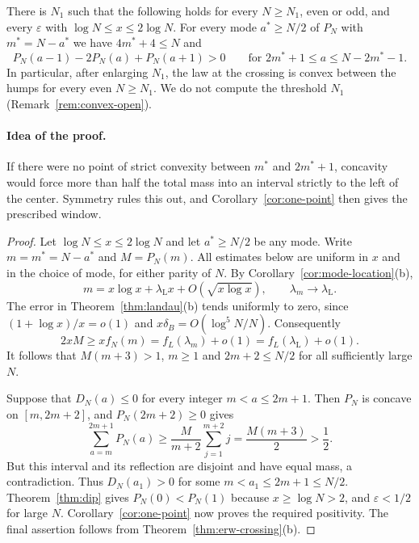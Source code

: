 \begin{proposition}\label{thm:convex-large}
There is $N_1$ such that the following holds for every $N\ge N_1$, even or odd, and every
$\varepsilon$ with $\log N\le x\le2\log N$. For every mode $a^*\ge N/2$ of $P_N$ with
$m^*=N-a^*$ we have $4m^*+4\le N$ and
\[
 P_N(a-1)-2P_N(a)+P_N(a+1)>0\qquad\text{for }2m^*+1\le a\le N-2m^*-1 .
\]
In particular, after enlarging $N_1$, the law at the crossing is convex between the humps for
every even $N\ge N_1$. We do not compute the threshold $N_1$ (Remark~\ref{rem:convex-open}).
\end{proposition}

\paragraph{Idea of the proof.}
If there were no point of strict convexity between $m^*$ and
$2m^*+1$, concavity would force more than half the total mass
into an interval strictly to the left of the center.
Symmetry rules this out, and Corollary~\ref{cor:one-point}
then gives the prescribed window.

\begin{proof}
Let $\log N\le x\le2\log N$ and let $a^*\ge N/2$ be any mode.
Write $m=m^*=N-a^*$ and $M=P_N(m)$. All estimates below are
uniform in $x$ and in the choice of mode, for either parity of $N$.
By Corollary~\ref{cor:mode-location}(b),
\[
 m=x\log x+\lambda_{\mathrm L}x+O(\sqrt{x\log x}),
 \qquad \lambda_m\longrightarrow\lambda_{\mathrm L}.
\]
The error in Theorem~\ref{thm:landau}(b) tends uniformly to zero,
since $(1+\log x)/x=o(1)$ and $x\delta_B=O(\log^5N/N)$.
Consequently
\[
 2xM\ge xf_N(m)=f_L(\lambda_m)+o(1)
                =f_L(\lambda_{\mathrm L})+o(1).
\]
It follows that $M(m+3)>1$, $m\ge1$ and $2m+2\le N/2$
for all sufficiently large $N$.

Suppose that $D_N(a)\le0$ for every integer $m<a\le2m+1$.
Then $P_N$ is concave on $[m,2m+2]$, and $P_N(2m+2)\ge0$ gives
\[
 \sum_{a=m}^{2m+1}P_N(a)
 \ge\frac{M}{m+2}\sum_{j=1}^{m+2}j
 =\frac{M(m+3)}2>\frac12.
\]
But this interval and its reflection are disjoint and have equal
mass, a contradiction. Thus $D_N(a_1)>0$ for some
$m<a_1\le2m+1\le N/2$.
Theorem~\ref{thm:dip} gives $P_N(0)<P_N(1)$ because
$x\ge\log N>2$, and $\varepsilon<1/2$ for large $N$.
Corollary~\ref{cor:one-point} now proves the required positivity.
The final assertion follows from Theorem~\ref{thm:erw-crossing}(b).
\end{proof}

